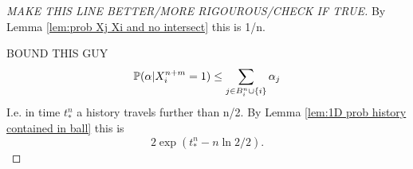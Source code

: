 \begin{proof}
		[MAKE THIS LINE BETTER/MORE RIGOUROUS/CHECK IF TRUE]

		By Lemma \ref{lem:prob Xj Xi and no intersect} this is 1/n. 


		BOUND THIS GUY
		\begin{equation}
			\mathbb{P}(\alpha | X_i^{n+m} = 1) \leq \sum_{j \in B_i^n \cup \{i\}} \alpha_j
		\end{equation}
		I.e. in time $t_*^n$ a history travels further than n/2. By Lemma \ref{lem:1D prob history contained in ball} this is
		\begin{equation}
			2\exp(t_*^n - n\ln 2 / 2).
		\end{equation}

	\end{proof}




